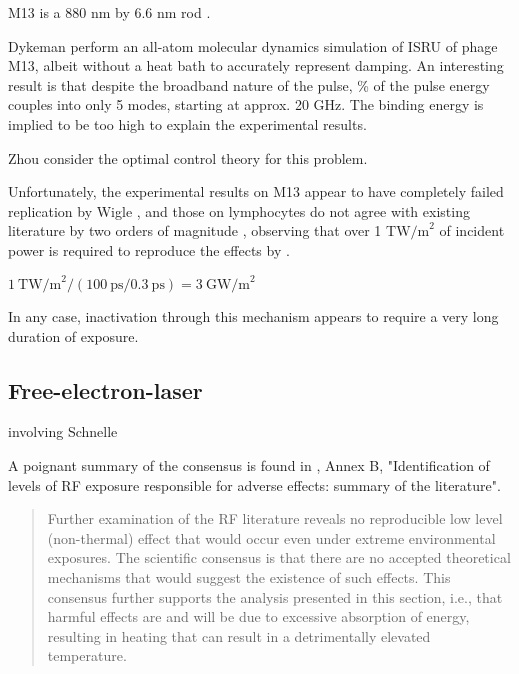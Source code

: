\documentclass[paper.tex]{subfiles}
\begin{document}
\begin{multicols}{1}
M13 is a 880 nm by 6.6 nm rod \cite{M132015}. 

Dykeman \cite{Vibrational2009} perform an all-atom molecular dynamics simulation of ISRU of phage M13, albeit without a heat bath to accurately represent damping. An interesting result is that despite the broadband nature of the pulse, \% of the pulse energy couples into only 5 modes, starting at approx. 20 GHz. The binding energy is implied to be too high to explain the experimental results. 

Zhou \cite{Maximum2010} consider the optimal control theory for this problem. 

Unfortunately, the experimental results on M13 appear to have completely failed replication by Wigle \cite{No2011}, and those on lymphocytes do not agree with existing literature by two orders of magnitude \cite{Targeted2002}, observing that over 1 T$\text{W/m}^2$ of incident power is required to reproduce the effects by . 

$1\ \text{TW/m}^2 / (100\ \text{ps} / 0.3\ \text{ps}) = 3\ \text{GW/m}^2$

In any case, inactivation through this mechanism appears to require a very long duration of exposure.




\subsection{Free-electron-laser }







involving Schnelle 



A poignant summary of the consensus is found in \cite{IEEE2006}, Annex B, "Identification of levels of RF exposure responsible for adverse effects: summary of the literature".

\begin{quote}
	Further examination of the RF literature reveals no reproducible low level (non-thermal) effect that would
	occur even under extreme environmental exposures. The scientific consensus is that there are no accepted
	theoretical mechanisms that would suggest the existence of such effects. This consensus further supports the
	analysis presented in this section, i.e., that harmful effects are and will be due to excessive absorption of
	energy, resulting in heating that can result in a detrimentally elevated temperature. 
	

\end{quote}
\end{multicols}
\end{document}
